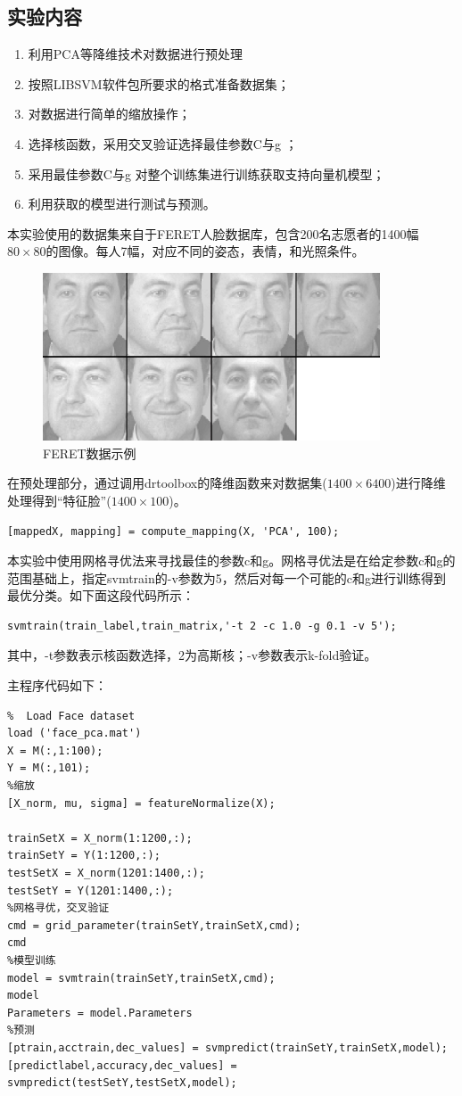 \documentclass[UTF8]{ctexart}
\begin{document}
\subsection*{实验内容}
\begin{enumerate}[\indent 1)]
    \item 利用PCA等降维技术对数据进行预处理
    \item 按照LIBSVM软件包所要求的格式准备数据集；
    \item 对数据进行简单的缩放操作；
    \item 选择核函数，采用交叉验证选择最佳参数C与g ；
    \item 采用最佳参数C与g 对整个训练集进行训练获取支持向量机模型；
    \item 利用获取的模型进行测试与预测。
\end{enumerate}
\par 本实验使用的数据集来自于FERET人脸数据库，包含200名志愿者的1400幅$80\times 80$的图像。每人7幅，对应不同的姿态，表情，和光照条件。
\begin{figure}[h!]
    \centering
    \includegraphics[width=10cm]{face.jpg}
    \caption{FERET数据示例}
    \label{face-sample}
\end{figure}
\par 在预处理部分，通过调用drtoolbox的降维函数来对数据集($1400\times 6400$)进行降维处理得到“特征脸”($1400\times 100$)。
\begin{lstlisting}
[mappedX, mapping] = compute_mapping(X, 'PCA', 100);
\end{lstlisting}
\par 本实验中使用网格寻优法来寻找最佳的参数c和g。网格寻优法是在给定参数c和g的范围基础上，指定svmtrain的-v参数为5，然后对每一个可能的c和g进行训练得到最优分类。如下面这段代码所示：
\begin{lstlisting}
svmtrain(train_label,train_matrix,'-t 2 -c 1.0 -g 0.1 -v 5');
\end{lstlisting}
其中，-t参数表示核函数选择，2为高斯核；-v参数表示k-fold验证。

\par 主程序代码如下：
\begin{lstlisting}
%  Load Face dataset
load ('face_pca.mat')
X = M(:,1:100);
Y = M(:,101);
%缩放
[X_norm, mu, sigma] = featureNormalize(X);

trainSetX = X_norm(1:1200,:);
trainSetY = Y(1:1200,:);
testSetX = X_norm(1201:1400,:);
testSetY = Y(1201:1400,:);
%网格寻优，交叉验证
cmd = grid_parameter(trainSetY,trainSetX,cmd);
cmd
%模型训练
model = svmtrain(trainSetY,trainSetX,cmd);
model
Parameters = model.Parameters
%预测
[ptrain,acctrain,dec_values] = svmpredict(trainSetY,trainSetX,model);
[predictlabel,accuracy,dec_values] = svmpredict(testSetY,testSetX,model);
\end{lstlisting}
\end{document}
